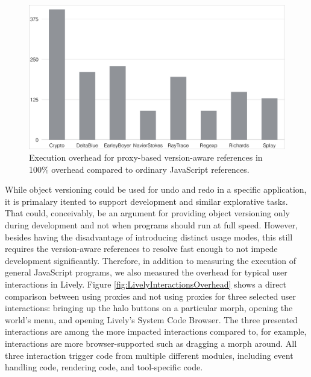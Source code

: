 \begin{figure}[h]
    \centering
    \includegraphics[width=\textwidth]{figures/executionOverhead.pdf}
    \caption{Execution overhead for proxy-based version-aware references in 100\% overhead compared to ordinary JavaScript references.}
    \label{fig:ExecutionOverhead}
\end{figure}

While object versioning could be used for undo and redo in a specific application, it is primalary itented to support development and similar explorative tasks.
That could, conceivably, be an argument for providing object versioning only during development and not when programs should run at full speed.
However, besides having the disadvantage of introducing distinct usage modes, this still requires the version-aware references to resolve fast enough to not impede development significantly.
Therefore, in addition to measuring the execution of general JavaScript programs, we also measured the overhead for typical user interactions in Lively.
Figure \ref{fig:LivelyInteractionsOverhead} shows a direct comparison between using proxies and not using proxies for three selected user interactions: bringing up the halo buttons on a particular morph, opening the world's menu, and opening Lively's System Code Browser.
The three presented interactions are among the more impacted interactions compared to, for example, interactions are more browser-supported such as dragging a morph around.
All three interaction trigger code from multiple different modules, including event handling code, rendering code, and tool-specific code.

